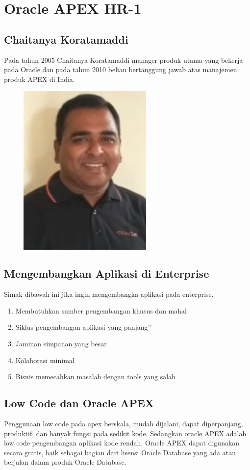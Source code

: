 \chapter{Oracle APEX HR-1}

\section{Chaitanya Koratamaddi}
 Pada tahun 2005 Chaitanya Koratamaddi manager produk utama yang bekerja pada Oracle dan pada tahun 2010 beliau bertanggung jawab atas manajemen produk APEX di India.
\begin{figure}[!htbp]
    \centering
    \includegraphics[scale=0.5]{section/gambar_bab1/chaitanya.png}
    \label{penanda}
\end{figure}

\section{Mengembangkan Aplikasi di Enterprise}
Simak dibawah ini jika ingin mengembangka aplikasi pada enterprise.
\begin{enumerate}
    \item Membutuhkan sumber pengembangan khusus dan mahal
    \item Siklus pengembangan aplikasi yang panjang’’
    \item Jaminan simpanan yang besar
    \item Kolaborasi minimal
    \item Bisnis memecahkan masalah dengan tools yang salah
\end{enumerate}

\section{Low Code dan Oracle APEX}
Penggunaan low code pada apex berskala, mudah dijalani, dapat diperpanjang, produktif, dan banyak fungsi pada sedikit kode. Sedangkan oracle APEX adalah low code pengembangan aplikasi kode rendah. Oracle APEX dapat digunakan secara gratis, baik sebagai bagian dari lisensi Oracle Database yang ada atau berjalan dalam produk Oracle Database.

